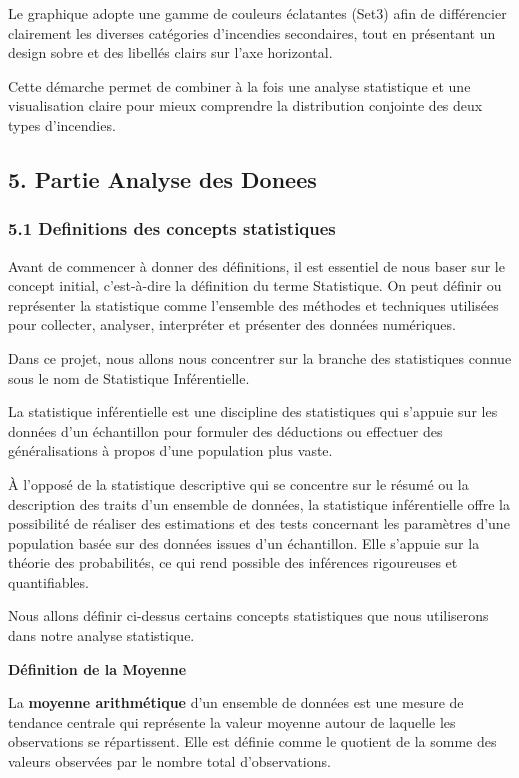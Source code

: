 \documentclass[
]{article}
\begin{document}
Le graphique adopte une gamme de couleurs éclatantes (Set3) afin de
différencier clairement les diverses catégories d'incendies secondaires,
tout en présentant un design sobre et des libellés clairs sur l'axe
horizontal.

Cette démarche permet de combiner à la fois une analyse statistique et
une visualisation claire pour mieux comprendre la distribution conjointe
des deux types d'incendies.

\subsection{5. Partie Analyse des
Donees}\label{partie-analyse-des-donees}

\subsubsection{5.1 Definitions des concepts
statistiques}\label{definitions-des-concepts-statistiques}

Avant de commencer à donner des définitions, il est essentiel de nous
baser sur le concept initial, c'est-à-dire la définition du terme
Statistique. On peut définir ou représenter la statistique comme
l'ensemble des méthodes et techniques utilisées pour collecter,
analyser, interpréter et présenter des données numériques.

Dans ce projet, nous allons nous concentrer sur la branche des
statistiques connue sous le nom de Statistique Inférentielle.

La statistique inférentielle est une discipline des statistiques qui
s'appuie sur les données d'un échantillon pour formuler des déductions
ou effectuer des généralisations à propos d'une population plus vaste.

À l'opposé de la statistique descriptive qui se concentre sur le résumé
ou la description des traits d'un ensemble de données, la statistique
inférentielle offre la possibilité de réaliser des estimations et des
tests concernant les paramètres d'une population basée sur des données
issues d'un échantillon. Elle s'appuie sur la théorie des probabilités,
ce qui rend possible des inférences rigoureuses et quantifiables.

Nous allons définir ci-dessus certains concepts statistiques que nous
utiliserons dans notre analyse statistique.

\textbf{Définition de la Moyenne}

La \textbf{moyenne arithmétique} d'un ensemble de données est une mesure
de tendance centrale qui représente la valeur moyenne autour de laquelle
les observations se répartissent. Elle est définie comme le quotient de
la somme des valeurs observées par le nombre total d'observations.
\end{document}

